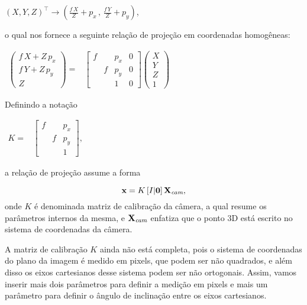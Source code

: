 \begin{center}
$(X,Y,Z)^\top \rightarrow (\frac{f\,X}{Z}+p_x\,,\,\frac{f\,Y}{Z}+p_y)$,
\end{center}
o qual nos fornece a seguinte relação de projeção em coordenadas homogêneas:

\begin{center}
$
\begin{array}{ccc}
\begin{pmatrix}
f\,X + Z\,p_x\\
f\,Y + Z\,p_y\\
Z
\end{pmatrix}=
&
\begin{bmatrix}
f& &p_x&0\\
 &f&p_y&0\\
 & &1&0
\end{bmatrix}
\begin{pmatrix}
X\\
Y\\
Z\\
1
\end{pmatrix}
\end{array}
$
\end{center}
Definindo a notação

\begin{center}
$
\begin{array}{cc}
K = & \begin{bmatrix}
      f& &p_x\\
       &f&p_y\\
       & &1
      \end{bmatrix}, 
\end{array}
$
\end{center}
a relação de projeção assume a forma


\begin{equation}\label{eq.camera-incompleta}
\mathbf{x}=K\,[I|{\bf 0}]\,\mathbf{X}_{\textit{cam}},
\end{equation}
onde $K$ é denominada matriz de calibração da câmera, a qual resume os parâmetros internos da mesma, e $\mathbf{X}_{\textit{cam}}$ enfatiza que o ponto 3D está escrito no sistema de coordenadas da câmera.

A matriz de calibração $K$ ainda não está completa, pois o sistema de coordenadas do plano da imagem é medido em pixels, que podem ser não quadrados, e além disso os eixos cartesianos desse sistema podem ser não ortogonais. Assim, vamos inserir mais dois parâmetros para definir a medição em pixels e mais um parâmetro para definir o ângulo de inclinação entre os eixos cartesianos.

